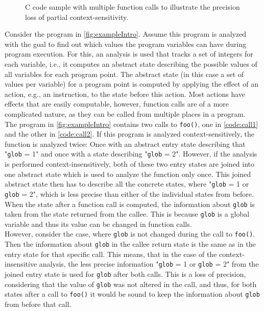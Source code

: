   \begin{figure}[!ht]
    \centering
    \begin{subfigure}{0.35\textwidth}
      \centering
      
    \end{subfigure}
    \caption{C code sample with multiple function calls to illustrate the precision loss of partial context-sensitivity.}
    \label{fig:exampleIntro}
  \end{figure}

  \noindent Consider the program in \autoref{fig:exampleIntro}. Assume this program is analyzed with the goal to find out which values the program variables can have during program execution. For this, an analysis is used that tracks a set of integers for each variable, i.e., it computes an abstract state describing the possible values of all variables for each program point. The abstract state (in this case a set of values per variable) for a program point is computed by applying the effect of an action, e.g., an instruction, to the state before this action. Most actions have effects that are easily computable, however, function calls are of a more complicated nature, as they can be called from multiple places in a program.\\
  The program in \autoref{fig:exampleIntro} contains two calls to \texttt{foo()}, one in \autoref{code:call1} and the other in \autoref{code:call2}. If this program is analyzed context-sensitively, the function is analyzed twice: Once with an abstract entry state describing that "\texttt{glob} = 1" and once with a state describing "\texttt{glob} = 2". However, if the analysis is performed context-insensitively, both of these two entry states are joined into one abstract state which is used to analyze the function only once. This joined abstract state then has to describe all the concrete states, where "\texttt{glob} = 1 or \texttt{glob} = 2", which is less precise than either of the individual states from before.\\
  When the state after a function call is computed, the information about \texttt{glob} is taken from the state returned from the callee. This is because \texttt{glob} is a global variable and thus its value can be changed in function calls.\\
  However, consider the case, where \texttt{glob} is not changed during the call to \texttt{foo()}. Then the information about \texttt{glob} in the callee return state is the same as in the entry state for that specific call. This means, that in the case of the context-insensitive analysis, the less precise information "\texttt{glob} = 1 or \texttt{glob} = 2" from the joined entry state is used for \texttt{glob} after both calls. This is a loss of precision, considering that the value of \texttt{glob} was not altered in the call, and thus, for both states after a call to \texttt{foo()} it would be sound to keep the information about \texttt{glob} from before that call.\\
